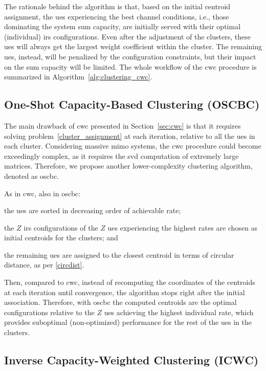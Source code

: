 The rationale behind the algorithm is that, based on the initial centroid assignment, the \glspl{ue} experiencing the best channel conditions, i.e., those dominating the system sum capacity, are initially served with their optimal (individual) \gls{irs} configurations. 
Even after the adjustment of the clusters, these \glspl{ue} will always get the largest weight coefficient within the cluster. The remaining \glspl{ue}, instead, will be penalized by the configuration constraints, but their impact on the sum capacity will be limited.
The whole workflow of the \gls{cwc} procedure is summarized in Algorithm~\ref{alg:clustering_cwc}.

\subsection{One-Shot Capacity-Based Clustering (OSCBC)}
\label{sec:clust_oscbc}
The main drawback of \gls{cwc} presented in Section~\ref{sec:cwc} is that it requires solving problem~\eqref{cluster_assignment} at each iteration, relative to all the \glspl{ue} in each cluster. 
Considering massive \gls{mimo} systems, the \gls{cwc} procedure could become exceedingly complex, as it requires the \gls{svd} computation of extremely large matrices.
Therefore, we propose another lower-complexity clustering algorithm, denoted as \gls{oscbc}.

As in \gls{cwc}, also in \gls{oscbc}:
\begin{enumerate*}[label=(\textit{\roman*})]
\item the \glspl{ue} are sorted in decreasing order of achievable rate; \item the $Z$ \gls{irs} configurations of the $Z$ \glspl{ue} experiencing the highest rates are chosen as initial centroids for the clusters; and \item the remaining \glspl{ue} are assigned to the closest centroid in terms of circular distance, as per \eqref{circdist}. 
\end{enumerate*}
Then, compared to \gls{cwc}, instead of recomputing the coordinates of the centroids at each iteration until convergence, the algorithm stops right after the initial association.
Therefore, with \gls{oscbc} the computed centroids are the optimal configurations relative to the $Z$ \glspl{ue} achieving the highest individual rate, which provides suboptimal (non-optimized) performance for the rest of the \glspl{ue} in the clusters.

\subsection{Inverse Capacity-Weighted Clustering (ICWC)}
\label{sec:icwc}

